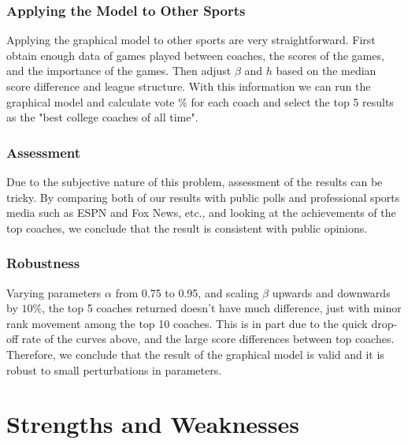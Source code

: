 \documentclass[11pt,notitlepage]{article}
\begin{document}
\subsubsection*{Applying the Model to Other Sports}

Applying the graphical model to other sports are very straightforward. First obtain enough data of games played between coaches, the scores of the games, and the importance of the games. Then adjust $\beta$ and $h$ based on the median score difference and league structure. With this information we can run the graphical model and calculate vote \% for each coach and select the top 5 results as the "best college coaches of all time".

\subsubsection*{Assessment}

\noindent Due to the subjective nature of this problem, assessment of the results can be tricky. By comparing both of our results with public polls and professional sports media such as ESPN and Fox News, etc., and looking at the achievements of the top coaches, we conclude that the result is consistent with public opinions.

\subsubsection*{Robustness}

\noindent Varying parameters $\alpha$ from 0.75 to 0.95, and scaling $\beta$ upwards and downwards by $10\%$, the top 5 coaches returned doesn't have much difference, just with minor rank movement among the top 10 coaches. This is in part due to the quick drop-off rate of the curves above, and the large score differences between top coaches. Therefore, we conclude that the result of the graphical model is valid and it is robust to small perturbations in parameters.

\section{Strengths and Weaknesses}
\end{document}
